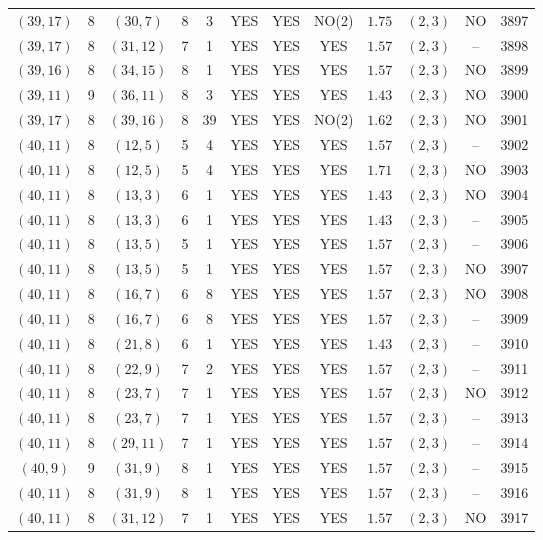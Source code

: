 \begin{longtable}{|c|c|c|c|c|c|c|c|c|c|c|c|}
$(39,17)$ & 8 & $(30,7)$ & 8 & 3 & YES & YES & NO(2) & $1.75$ & $(2,3)$ & NO & 3897\\
$(39,17)$ & 8 & $(31,12)$ & 7 & 1 & YES & YES & YES & $1.57$ & $(2,3)$ & -- & 3898\\
$(39,16)$ & 8 & $(34,15)$ & 8 & 1 & YES & YES & YES & $1.57$ & $(2,3)$ & NO & 3899\\
$(39,11)$ & 9 & $(36,11)$ & 8 & 3 & YES & YES & YES & $1.43$ & $(2,3)$ & NO & 3900\\
$(39,17)$ & 8 & $(39,16)$ & 8 & 39 & YES & YES & NO(2) & $1.62$ & $(2,3)$ & NO & 3901\\
$(40,11)$ & 8 & $(12,5)$ & 5 & 4 & YES & YES & YES & $1.57$ & $(2,3)$ & -- & 3902\\
$(40,11)$ & 8 & $(12,5)$ & 5 & 4 & YES & YES & YES & $1.71$ & $(2,3)$ & NO & 3903\\
$(40,11)$ & 8 & $(13,3)$ & 6 & 1 & YES & YES & YES & $1.43$ & $(2,3)$ & NO & 3904\\
$(40,11)$ & 8 & $(13,3)$ & 6 & 1 & YES & YES & YES & $1.43$ & $(2,3)$ & -- & 3905\\
$(40,11)$ & 8 & $(13,5)$ & 5 & 1 & YES & YES & YES & $1.57$ & $(2,3)$ & -- & 3906\\
$(40,11)$ & 8 & $(13,5)$ & 5 & 1 & YES & YES & YES & $1.57$ & $(2,3)$ & NO & 3907\\
$(40,11)$ & 8 & $(16,7)$ & 6 & 8 & YES & YES & YES & $1.57$ & $(2,3)$ & NO & 3908\\
$(40,11)$ & 8 & $(16,7)$ & 6 & 8 & YES & YES & YES & $1.57$ & $(2,3)$ & -- & 3909\\
$(40,11)$ & 8 & $(21,8)$ & 6 & 1 & YES & YES & YES & $1.43$ & $(2,3)$ & -- & 3910\\
$(40,11)$ & 8 & $(22,9)$ & 7 & 2 & YES & YES & YES & $1.57$ & $(2,3)$ & -- & 3911\\
$(40,11)$ & 8 & $(23,7)$ & 7 & 1 & YES & YES & YES & $1.57$ & $(2,3)$ & NO & 3912\\
$(40,11)$ & 8 & $(23,7)$ & 7 & 1 & YES & YES & YES & $1.57$ & $(2,3)$ & -- & 3913\\
$(40,11)$ & 8 & $(29,11)$ & 7 & 1 & YES & YES & YES & $1.57$ & $(2,3)$ & -- & 3914\\
$(40,9)$ & 9 & $(31,9)$ & 8 & 1 & YES & YES & YES & $1.57$ & $(2,3)$ & -- & 3915\\
$(40,11)$ & 8 & $(31,9)$ & 8 & 1 & YES & YES & YES & $1.57$ & $(2,3)$ & -- & 3916\\
$(40,11)$ & 8 & $(31,12)$ & 7 & 1 & YES & YES & YES & $1.57$ & $(2,3)$ & NO & 3917\\

\end{longtable}
